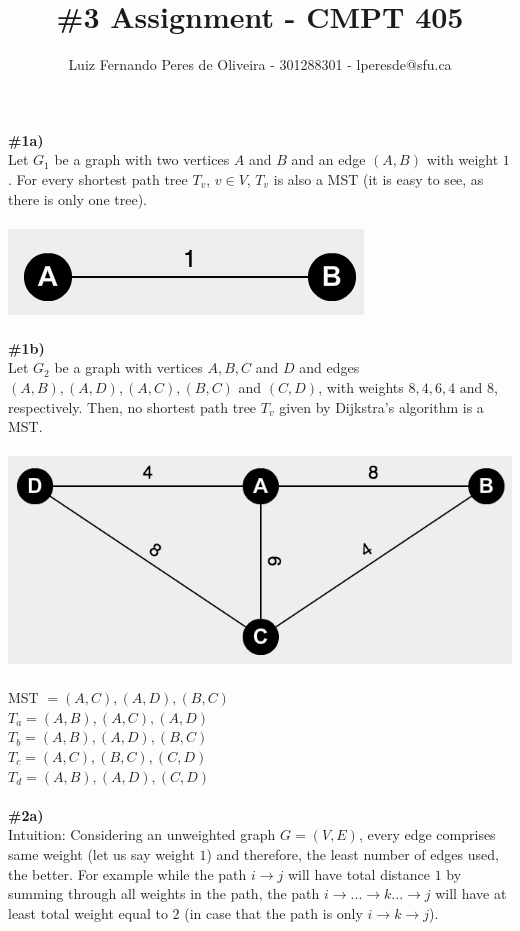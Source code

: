 \documentclass{article}
\title{\#3 Assignment - CMPT 405}
\author{Luiz Fernando Peres de Oliveira - 301288301 - lperesde@sfu.ca}
\begin{document}
\maketitle
\textbf{\#1a)}
\\
Let $G_1$ be a graph with two vertices $A$ and $B$ and an edge $(A, B)$ with weight $1$. For every shortest path tree $T_v$, $v \in V$, $T_v$ is also a MST (it is easy to see, as there is only one tree).
\\
\\
\includegraphics[scale=0.6]{simple_graph_hw3}
\\
\\
\textbf{\#1b)}
\\
Let $G_2$ be a graph with vertices $A, B, C$ and $D$ and edges $(A, B), (A, D), (A,C), (B,C)$ and $(C,D)$, with weights $8, 4, 6, 4 \text{ and } 8$, respectively. Then, no shortest path tree $T_v$ given by Dijkstra's algorithm is a MST.
\\
\\
\includegraphics[scale=0.4]{complex_graph_hw3}
\\
\\
MST $= (A,C), (A,D), (B,C)$
\\
$T_a = (A, B), (A, C), (A, D)$
\\
$T_b = (A, B), (A, D), (B, C)$
\\
$T_c = (A, C), (B, C), (C, D)$
\\
$T_d = (A, B), (A, D), (C, D)$
\\
\\
\textbf{\#2a)}
\\
Intuition: Considering an unweighted graph $G = (V, E)$, every edge comprises same weight (let us say weight $1$) and therefore, the least number of edges used, the better. For example while the path $i \rightarrow j$ will have total distance $1$ by summing through all weights in the path, the path $i \rightarrow ... \rightarrow k ... \rightarrow j$ will have at least total weight equal to $2$ (in case that the path is only $i \rightarrow k \rightarrow j$).
\end{document}

